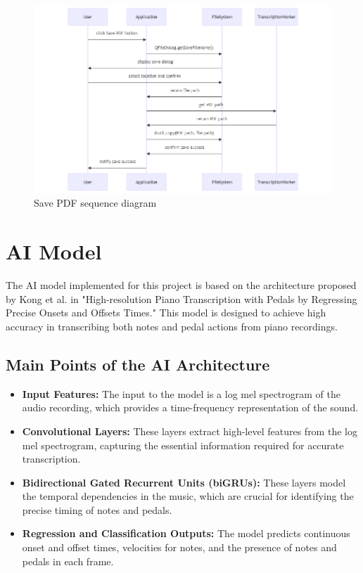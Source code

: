 \documentclass{article}
\begin{document}
\begin{figure}[htbp]
    \centering
    \includegraphics[width=\textwidth]{../diagrams/save_pdf_seq.png}
    \caption{Save PDF sequence diagram}
    \label{fig:save_pdf_sequence_diagram}
\end{figure}

\FloatBarrier
\clearpage

\section{AI Model}
The AI model implemented for this project is based on the architecture proposed by Kong et al. in "High-resolution Piano Transcription with Pedals by Regressing Precise Onsets and Offsets Times." This model is designed to achieve high accuracy in transcribing both notes and pedal actions from piano recordings.

\subsection{Main Points of the AI Architecture}
\begin{itemize}
    \item \textbf{Input Features:} The input to the model is a log mel spectrogram of the audio recording, which provides a time-frequency representation of the sound.
    \item \textbf{Convolutional Layers:} These layers extract high-level features from the log mel spectrogram, capturing the essential information required for accurate transcription.
    \item \textbf{Bidirectional Gated Recurrent Units (biGRUs):} These layers model the temporal dependencies in the music, which are crucial for identifying the precise timing of notes and pedals.
    \item \textbf{Regression and Classification Outputs:} The model predicts continuous onset and offset times, velocities for notes, and the presence of notes and pedals in each frame.
\end{itemize}
\end{document}

